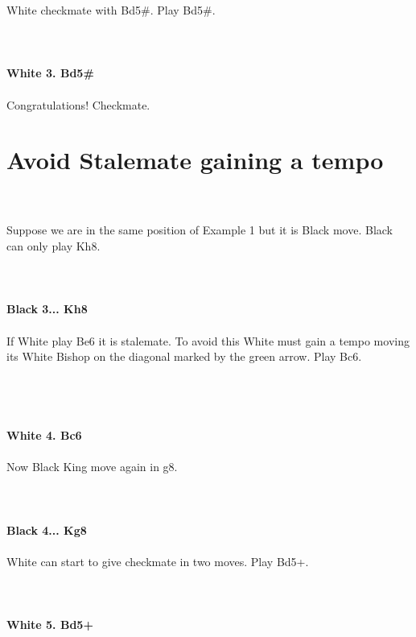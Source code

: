 \documentclass{article}
\begin{document}
White checkmate with Bd5\#. Play Bd5\#.\\
\\

\\
\\
\textbf{White 3. Bd5\#}\\
\\
Congratulations! Checkmate.\section{ Avoid Stalemate gaining a tempo}

\\
\\
Suppose we are in the same position of Example 1 but it is Black move. Black can only play Kh8.\\
\\

\\
\\
\textbf{Black 3... Kh8}\\
\\
If White play Be6 it is stalemate. To avoid this White must gain a tempo moving its White Bishop on the diagonal marked by the green arrow. Play Bc6.\\\\
\\

\\
\\
\textbf{White 4. Bc6}\\
\\
Now Black King move again in g8.\\
\\

\\
\\
\textbf{Black 4... Kg8}\\
\\
White can start to give checkmate in two moves. Play Bd5+.\\
\\

\\
\\
\textbf{White 5. Bd5+}\\
\end{document}

